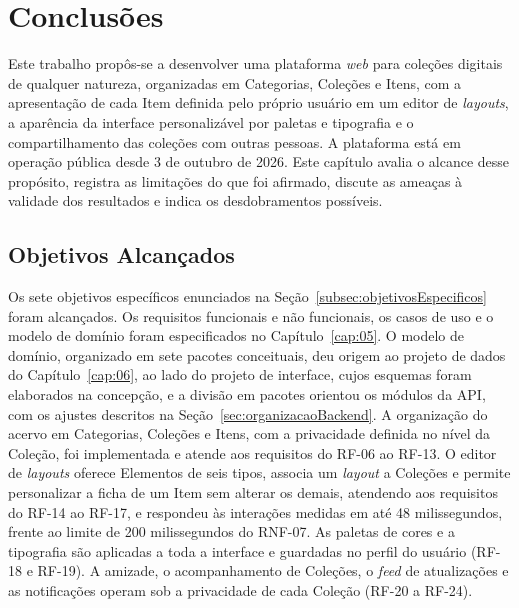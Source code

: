 \chapter{Conclusões}
\label{cap:12}

Este trabalho propôs-se a desenvolver uma plataforma \textit{web} para coleções digitais de qualquer natureza, organizadas em Categorias, Coleções e Itens, com a apresentação de cada Item definida pelo próprio usuário em um editor de \textit{layouts}, a aparência da interface personalizável por paletas e tipografia e o compartilhamento das coleções com outras pessoas. A plataforma está em operação pública desde 3 de outubro de 2026. Este capítulo avalia o alcance desse propósito, registra as limitações do que foi afirmado, discute as ameaças à validade dos resultados e indica os desdobramentos possíveis.

\section{Objetivos Alcançados}

Os sete objetivos específicos enunciados na Seção~\ref{subsec:objetivosEspecificos} foram alcançados. Os requisitos funcionais e não funcionais, os casos de uso e o modelo de domínio foram especificados no Capítulo~\ref{cap:05}. O modelo de domínio, organizado em sete pacotes conceituais, deu origem ao projeto de dados do Capítulo~\ref{cap:06}, ao lado do projeto de interface, cujos esquemas foram elaborados na concepção, e a divisão em pacotes orientou os módulos da API, com os ajustes descritos na Seção~\ref{sec:organizacaoBackend}. A organização do acervo em Categorias, Coleções e Itens, com a privacidade definida no nível da Coleção, foi implementada e atende aos requisitos do RF-06 ao RF-13. O editor de \textit{layouts} oferece Elementos de seis tipos, associa um \textit{layout} a Coleções e permite personalizar a ficha de um Item sem alterar os demais, atendendo aos requisitos do RF-14 ao RF-17, e respondeu às interações medidas em até 48 milissegundos, frente ao limite de 200 milissegundos do RNF-07. As paletas de cores e a tipografia são aplicadas a toda a interface e guardadas no perfil do usuário (RF-18 e RF-19). A amizade, o acompanhamento de Coleções, o \textit{feed} de atualizações e as notificações operam sob a privacidade de cada Coleção (RF-20 a RF-24).

